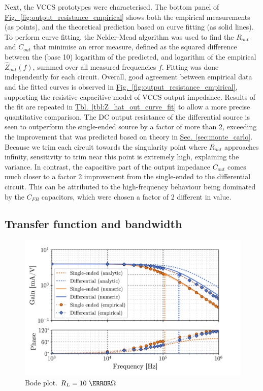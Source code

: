 \documentclass[10pt]{article}
\newcommand{\brieftbllink}[1]{\hyperref[#1]{Tbl.~\ref*{#1}}\xspace }
\newcommand{\briefseclink}[1]{\hyperref[#1]{Sec.~\ref*{#1}}}
\newcommand{\brieffiglink}[1]{\hyperref[#1]{Fig.~\ref*{#1}}}
\begin{document}
Next, the VCCS prototypes were characterised. The bottom panel of \brieffiglink{fig:output_resistance_empirical} shows both the empirical measurements (as points), and the theoretical prediction based on curve fitting (as solid lines). To perform curve fitting, the Nelder-Mead algorithm \cite{neldermead} was used to find the $R_{out}$ and $C_{out}$ that minimise an error measure, defined as the squared difference between the (base 10) logarithm of the predicted, and logarithm of the empirical $\hat{Z}_{out}(f)$, summed over all measured frequencies $f$. Fitting was done independently for each circuit. Overall, good agreement between empirical data and the fitted curves is observed in \brieffiglink{fig:output_resistance_empirical}, supporting the resistive-capacitive model of VCCS output impedance. Results of the fit are repeated in \brieftbllink{tbl:Z_hat_out_curve_fit} to allow a more precise quantitative comparison. The DC output resistance of the differential source is seen to outperform the single-ended source by a factor of more than 2, exceeding the improvement that was predicted based on theory in \briefseclink{sec:monte_carlo}. Because we trim each circuit towards the singularity point where $R_{out}$ approaches infinity, sensitivity to trim near this point is extremely high, explaining the variance. In contrast, the capacitive part of the output impedance $C_{out}$ comes much closer to a factor 2 improvement from the single-ended to the differential circuit. This can be attributed to the high-frequency behaviour being dominated by the $C_{FB}$ capacitors, which were chosen a factor of 2 different in value.

\subsection{Transfer function and bandwidth}

\begin{figure}[t!]
	\centering
    \includegraphics[scale=.6]{transfer_function.pdf}
	\caption{\small Bode plot. $R_L=10~\kilo\ohm$}
	\label{fig:bode_plot}
\end{figure}
\end{document}
